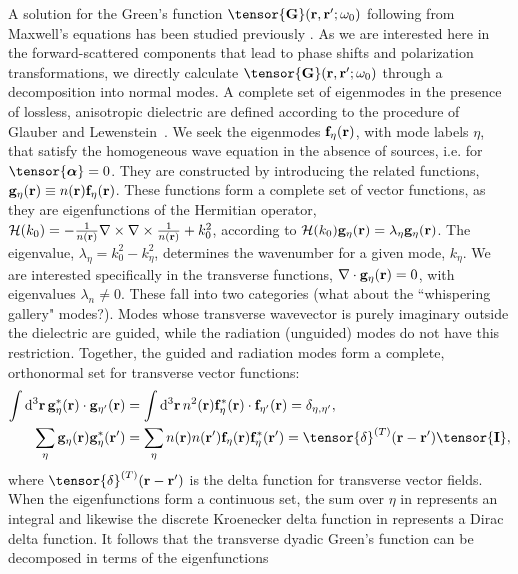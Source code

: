 \documentclass[preprint,aps,pra,onecolumn]{revtex4-1} %
\newcommand{\fidx}{\eta}
\newcommand{\unittens}{\tensor{\mathbf{I}}}
\newcommand{\eigenf}{\mbf{f}_\fidx}
\newcommand{\eigenfp}{\mbf{f}_{\fidx'}}
\newcommand{\eigeng}{\mbf{g}_\fidx}
\newcommand{\eigengp}{\mbf{g}_{\fidx'}}
\newcommand{\comment}[1]{{\color{Maroon} #1}}
\begin{document}
A solution for the Green's function $\tensor{\mathbf{G}}(\br ,\br' ; \omega_0)$ following from Maxwell's equations 
has been studied previously \cite{sakoda_optical_1996,sondergaard_general_2001,wubs_multiple-scattering_2004}.  As we are interested here in the forward-scattered components that lead to phase shifts and polarization transformations, we directly calculate $\tensor{\mathbf{G}}(\br ,\br' ; \omega_0)$ through a decomposition into normal modes.  A complete set of eigenmodes in the presence of lossless, anisotropic dielectric are defined according to the procedure of Glauber and Lewenstein~\cite{glauber_quantum_1991}.  We seek the eigenmodes $\eigenf(\mathbf{r})$, with mode labels $\fidx$, that satisfy the homogeneous wave equation in the absence of sources, i.e.  for $\tensor{\boldsymbol{\alpha}} = 0$.  They are constructed by introducing the related functions, $\eigeng(\mbf{r}) \equiv n(\br) \eigenf(\mbf{r})$.  These functions form a complete set of vector functions, as they are eigenfunctions of the Hermitian operator, $\mathcal{H}(k_0) = -\frac{1}{n(\mathbf{r})} \nabla\times\nabla\times \frac{1}{n(\mathbf{r})} + k_0^2$, according to $\mathcal{H}(k_0)  \eigeng(\mbf{r}) = \lambda_\fidx \eigeng(\mbf{r})$. The eigenvalue, $\lambda_\fidx= k_0^2-k_\fidx^2$, determines the wavenumber for a given mode, $k_\fidx$.  We are interested specifically in the transverse functions, $\nabla \cdot \eigeng(\br) = 0$, with eigenvalues $\lambda_n \neq 0$.  These fall into two categories \comment{(what about the ``whispering gallery" modes?)}.  Modes whose transverse wavevector is purely imaginary outside the dielectric are guided, while the radiation (unguided) modes do not have this restriction. Together, the guided and radiation modes form a complete, orthonormal set for transverse vector functions:
	\begin{align}
	\int \mathrm{d}^3\br \, \eigeng^*(\mbf{r}) \cdot \eigengp(\mbf{r})  &= \int \mathrm{d}^3\br \, n^2(\br) \eigenf^* (\br)\cdot  \eigenfp(\br) =\delta_{\fidx, \fidx'},\label{Eq::Orthogonality}\\
	\sum_\fidx \eigeng(\br) \eigeng^*(\br') &= \sum_\fidx n(\br)n(\br') \eigenf(\br) \eigenf^*(\br') =\tensor{\delta}^{(T)}(\br-\br')  \unittens, \label{Eq::Completeness}
	\end{align}
where $\tensor{\delta}^{(T)}(\br-\br')$ is the delta function for transverse vector fields.  When the eigenfunctions form a continuous set, the sum over $\fidx$ in  represents an integral and likewise the discrete Kroenecker delta function in  represents a Dirac delta function.  It follows that the transverse dyadic Green's function can be decomposed in terms of the eigenfunctions~\cite{sakoda_optical_1996, sondergaard_general_2001}
\end{document}
